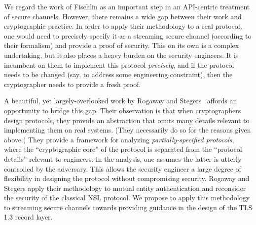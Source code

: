 We regard the work of Fischlin \etal as an important step in an API-centric
treatment of secure channels.
%
However, there remains a wide gap between their work and cryptographic practice.
In order to apply their methodology to a real protocol, one would need to
precisely specify it as a streaming secure channel (according to their
formalism) and provide a proof of security. This on its own is a complex
undertaking, but it also places a heavy burden on the security engineers. It is
incumbent on them to implement this protocol \emph{precisely}, and if the
protocol needs to be changed (say, to address some engineering constraint), then
the cryptographer needs to provide a fresh proof.
%

\begin{task}\label{task:sc}
  A beautiful, yet largely-overlooked work by Rogaway and Stegers~\cite{RS09}
  affords an opportunity to bridge this gap. Their observation is that when
  cryptographers design protocols, they provide an abstraction that omits many
  details relevant to implementing them on real systems. (They necessarily do
  so for the reasons given above.)
  They provide a framework for analyzing \emph{partially-specified protocols},
  where the ``cryptographic core'' of the protocol is separated from the
  ``protocol details'' relevant to engineers. In the analysis, one assumes the
  latter is utterly controlled by the adversary. This  allows the security
  engineer a large degree of flexibility in designing the protocol without
  compromising security.
  Rogaway and Stegers apply their methodology to mutual entity authentication
  and reconsider the security of the classical NSL
  protocol.
  We propose to apply this methodology to streaming secure channels towards
  providing guidance in the design of the TLS 1.3 record layer.
\end{task}

